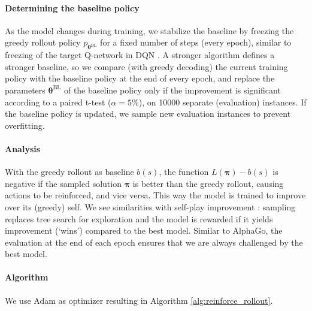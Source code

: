 \paragraph{Determining the baseline policy}
As the model changes during training, we stabilize the baseline by freezing the greedy rollout policy $p_{\bm{\theta}^{\text{BL}}}$ for a fixed number of steps (every epoch), similar to freezing of the target Q-network in DQN \citep{mnih2015human}. A stronger algorithm defines a stronger baseline, so we compare (with greedy decoding) the current training policy with the baseline policy at the end of every epoch, and replace the parameters $\bm{\theta}^{\text{BL}}$ of the baseline policy only if the improvement is significant according to a paired t-test ($\alpha = 5 \%$), on 10000 separate (evaluation) instances. If the baseline policy is updated, we sample new evaluation instances to prevent overfitting.

\paragraph{Analysis}
With the greedy rollout as baseline $b(s)$, the function $L(\bm{\pi}) - b(s)$ is negative if the sampled solution $\bm{\pi}$ is better than the greedy rollout, causing actions to be reinforced, and vice versa. This way the model is trained to improve over its (greedy) self. We see similarities with self-play improvement \citep{silver2017mastering}: sampling replaces tree search for exploration and the model is rewarded if it yields improvement (`wins') compared to the best model. Similar to AlphaGo, the evaluation at the end of each epoch ensures that we are always challenged by the best model.

\paragraph{Algorithm}
We use Adam \citep{kingma2015adam} as optimizer resulting in Algorithm \ref{alg:reinforce_rollout}.



